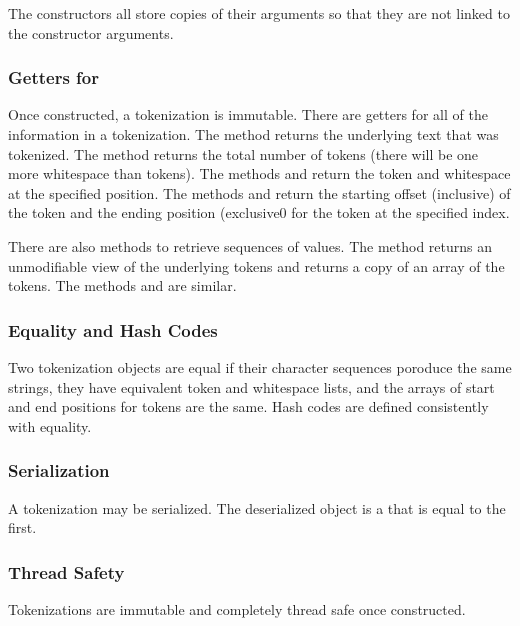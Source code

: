 The constructors all store copies of their arguments so that they are
not linked to the constructor arguments.


\subsubsection{Getters for }

Once constructed, a tokenization is immutable.  There are getters for
all of the information in a tokenization.  The method 
returns the underlying text that was tokenized.  The method
 returns the total number of tokens (there will be
one more whitespace than tokens).  The methods  and
 return the token and whitespace at the
specified position.  The methods  and
 return the starting offset (inclusive) of the
token and the ending position (exclusive0 for the token at the
specified index.

There are also methods to retrieve sequences of values.  The method
 returns an unmodifiable view of the underlying
tokens and  returns a copy of an array of the tokens.
The methods  and  are
similar.  


\subsubsection{Equality and Hash Codes}

Two tokenization objects are equal if their character sequences
poroduce the same strings, they have equivalent token and
whitespace lists, and the arrays of start and end positions for
tokens are the same.  Hash codes are defined consistently with
equality.


\subsubsection{Serialization}

A tokenization may be serialized.  The deserialized object is 
a  that is equal to the first.


\subsubsection{Thread Safety}

Tokenizations are immutable and completely thread safe once
constructed.

